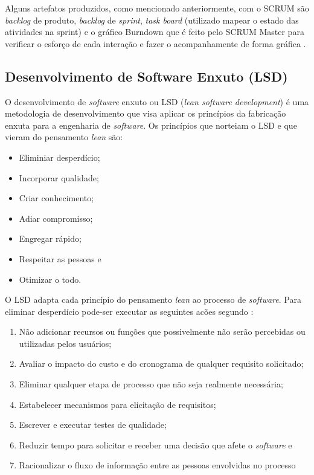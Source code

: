 Alguns artefatos produzidos, como mencionado anteriormente, com o SCRUM são \textit{backlog} de produto, \textit{backlog} de \textit{sprint}, \textit{task board} (utilizado mapear o estado das atividades na sprint) e o gráfico Burndown que é feito pelo SCRUM Master para verificar o esforço de cada interação e fazer o acompanhamente de forma gráfica \cite{macedo:12}. 

\subsection{Desenvolvimento de Software Enxuto (LSD)}

O desenvolvimento de \textit{software} enxuto ou LSD (\textit{lean software development}) é uma metodologia de desenvolvimento que visa aplicar os princípios da fabricação enxuta para a engenharia de \textit{software}. Os princípios que norteiam o LSD e que vieram do pensamento \textit{lean} são:

\begin{itemize}
	\item Eliminiar desperdício;
	\item Incorporar qualidade;
	\item Criar conhecimento;
	\item Adiar compromisso;
	\item Engregar rápido;
	\item Respeitar as pessoas e
	\item Otimizar o todo.
\end{itemize}

O LSD adapta cada princípio do pensamento \textit{lean} ao processo de \textit{software}. Para eliminar desperdício pode-ser executar as seguintes acões segundo :

\begin{enumerate}
	\item Não adicionar recursos ou funções que possivelmente não serão percebidas ou utilizadas pelos usuários;
	\item Avaliar o impacto do custo e do cronograma de qualquer requisito solicitado;
	\item Eliminar qualquer etapa de processo que não seja realmente necessária;
	\item Estabelecer mecanismos para elicitação de requisitos;
	\item Escrever e executar testes de qualidade;
	\item Reduzir tempo para solicitar e receber uma decisão que afete o \textit{software} e
	\item Racionalizar o fluxo de informação entre as pessoas envolvidas no processo
\end{enumerate}

